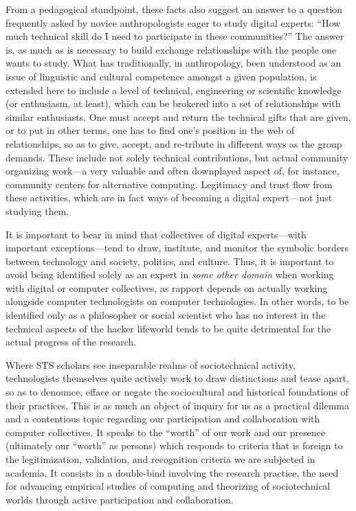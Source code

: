 \documentclass[10pt,letter,oneside]{scrartcl}
\begin{document}
From a pedagogical standpoint, these facts also suggest an answer to a
question frequently asked by novice anthropologists eager to study
digital experts: ``How much technical skill do I need to participate
in these communities?''  The answer is, as much as is necessary to
build exchange relationships with the people one wants to study.  What
has traditionally, in anthropology, been understood as an issue of
linguistic and cultural competence amongst a given population, is
extended here to include a level of technical, engineering or
scientific knowledge (or enthusiasm, at least), which can be brokered
into a set of relationships with similar enthusiasts. One must accept
and return the technical gifts that are given, or to put in other
terms, one has to find one's position in the web of relationships, so
as to give, accept, and re-tribute in different ways as the group
demands. These include not solely technical contributions, but actual
community organizing work---a very valuable and often downplayed
aspect of, for instance, community centers for alternative computing.
Legitimacy and trust flow from these activities, which are in fact
ways of becoming a digital expert---not just studying them.

It is important to bear in mind that collectives of digital
experts---with important exceptions---tend to draw, institute, and
monitor the symbolic borders between technology and society, politics,
and culture. Thus, it is important to avoid being identified solely as
an expert in \emph{some other domain} when working with digital or
computer collectives, as rapport depends on actually working alongside
computer technologists on computer technologies.  In other words, to
be identified only as a philosopher or social scientist who has no interest
in the technical aspects of the hacker lifeworld tends to be quite
detrimental for the actual progress of the research.

Where STS scholars see inseparable realms of sociotechnical activity,
technologists themselves quite actively work to draw distinctions and
tease apart, so as to denounce, efface or negate the sociocultural and
historical foundations of their practices.  This is as much an object
of inquiry for us as a practical dilemma and a contentious topic
regarding our participation and collaboration with computer
collectives. It speaks to the ``worth'' of our work \cite{Stark} and
our presence (ultimately our ``worth'' as persons) which responds to
criteria that is foreign to the legitimization, validation, and
recognition criteria we are subjected in academia.  It consists in a
double-bind involving the research practice, the need for advancing
empirical studies of computing and theorizing of sociotechnical worlds
through active participation and collaboration.
\end{document}
